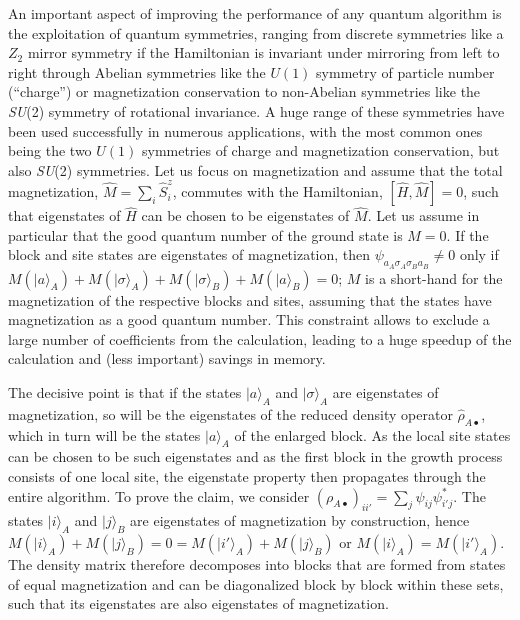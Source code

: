 \documentclass[a4paper,10pt,oneside,onecolumn,1p,times]{elsarticle}
\newcommand{\ket}[1]{\mbox{$| #1  \rangle$}}
\begin{document}
An important aspect of improving the performance of any quantum algorithm is the exploitation of quantum symmetries, ranging from discrete symmetries like a $Z_2$ mirror symmetry if the Hamiltonian is invariant under mirroring from left to right through Abelian symmetries like the $U(1)$ symmetry of particle number (``charge'') or magnetization conservation to non-Abelian symmetries like the {\em SU}(2) symmetry of rotational invariance\cite{McCulloch07,SierraNishino97,McCulloch00,McCulloch01,McCulloch02}. A huge range of these symmetries have been used successfully in numerous applications, with the most common ones being the two $U(1)$ symmetries of charge and magnetization conservation, but also {\em SU}(2) symmetries\cite{McCulloch08a,Smerat09,Langer09,Holzner09}. Let us focus on magnetization and assume that the total magnetization, $\hat{M} = \sum_i \hat{S}^z_i$, commutes with the Hamiltonian, $[\hat{H},\hat{M}]=0$, such that eigenstates of $\hat{H}$ can be chosen to be eigenstates of $\hat{M}$. Let us assume in particular that the good quantum number of the ground state is $M=0$. If the block and site states are eigenstates of magnetization, then $\psi_{a_A \sigma_A \sigma_B a_B} \neq 0$ only if $M (\ket{a}_A) +  M (\ket{\sigma}_A) + M (\ket{\sigma}_B) + M (\ket{a}_B) = 0$;
$M$ is a short-hand for the magnetization of the respective blocks and sites, assuming that the states have magnetization as a good quantum number. This constraint allows to exclude a large number of coefficients from the calculation, leading to a huge speedup of the calculation and (less important) savings in memory.

The decisive point is that if the states $\ket{a}_A$ and $\ket{\sigma}_A$ are eigenstates of magnetization, so will be the eigenstates of the reduced density operator $\hat{\rho}_{A\bullet}$, which in turn will be the states $\ket{a}_A$ of the enlarged block. As the local site states can be chosen to be such eigenstates and as the first block in the growth process consists of one local site, the eigenstate property then propagates through the entire algorithm. To prove the claim, we consider $(\rho_{A\bullet})_{ii'} = \sum_j \psi_{ij} \psi^*_{i'j}$. The states $\ket{i}_A$ and $\ket{j}_B$ are eigenstates of magnetization by construction, hence 
$M (\ket{i}_A) + M(\ket{j}_B) = 0 = M (\ket{i'}_A) + M (\ket{j}_B)$ or $M (\ket{i}_A) = M (\ket{i'}_A)$. The density matrix therefore decomposes into blocks that are formed from states of equal magnetization and can be diagonalized block by block within these sets, such that its eigenstates are also eigenstates of magnetization.
\end{document}
